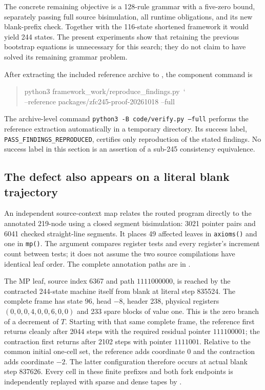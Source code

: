 The concrete remaining objective is a 128-rule grammar with a five-zero
bound, separately passing full source bisimulation, all runtime obligations,
and its new blank-prefix check.  Together with the 116-state shortened
framework it would yield 244 states.  The present experiments show that
retaining the previous bootstrap equations is unnecessary for this search;
they do not claim to have solved its remaining grammar problem.

After extracting the included reference archive to
, the component command is
\begin{quote}\small\ttfamily
python3 framework\_work/reproduce\_findings.py\ \char`\\
\newline
\hspace*{1em}--reference packages/zfc245-proof-20261018 --full
\end{quote}
The archive-level command \texttt{python3 -B code/verify.py --full}
performs the reference extraction automatically in a temporary directory.
Its success label, \texttt{PASS\_FINDINGS\_REPRODUCED}, certifies only
reproduction of the stated findings.  No success label in this section is
an assertion of a sub-245 consistency equivalence.

\subsection{The defect also appears on a literal blank trajectory}

An independent source-context map relates the routed program directly to the
annotated 219-node  using a closed segment bisimulation:
3021 pointer pairs and 6041 checked straight-line segments. It places 49
affected leaves in \texttt{axioms()} and one in \texttt{mp()}. The argument
compares register tests and every register's increment count between tests;
it does not assume the two source compilations have identical leaf order.
The complete annotation paths are in .

The MP leaf, source index 6367 and path $1111000000$, is reached by the
contracted 244-state machine itself from blank at literal step 835524.
The complete frame has state 96, head $-8$, header 238, physical registers
$(0,0,0,4,0,0,6,0,0)$ and 233 spare blocks of value one. This is the zero
branch of a decrement of $T$. Starting with that same complete frame,
the reference first returns cleanly after 2044 steps with the required
residual pointer $111100001$; the contraction first returns after 2102
steps with pointer $1111001$. Relative to the common initial one-cell set,
the reference adds coordinate $0$ and the contraction adds coordinate $-2$.
The latter configuration therefore occurs at actual blank step 837626.
Every cell in these finite prefixes and both fork endpoints is independently
replayed with sparse and dense tapes by
.

